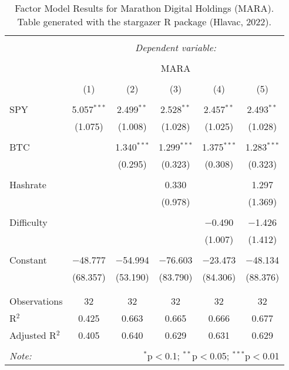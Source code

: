 
\begin{table}[!htbp] \centering 
  \caption{Factor Model Results for Marathon Digital Holdings (MARA). Table generated with the stargazer R package (Hlavac, 2022).} 
  \label{ModelResults_MARA} 
\large 
\begin{tabular}{@{\extracolsep{5pt}}lccccc} 
\\[-1.8ex]\hline 
\hline \\[-1.8ex] 
 & \multicolumn{5}{c}{\textit{Dependent variable:}} \\ 
\cline{2-6} 
\\[-1.8ex] & \multicolumn{5}{c}{MARA} \\ 
\\[-1.8ex] & (1) & (2) & (3) & (4) & (5)\\ 
\hline \\[-1.8ex] 
 SPY & 5.057$^{***}$ & 2.499$^{**}$ & 2.528$^{**}$ & 2.457$^{**}$ & 2.493$^{**}$ \\ 
  & (1.075) & (1.008) & (1.028) & (1.025) & (1.028) \\ 
  & & & & & \\ 
 BTC &  & 1.340$^{***}$ & 1.299$^{***}$ & 1.375$^{***}$ & 1.283$^{***}$ \\ 
  &  & (0.295) & (0.323) & (0.308) & (0.323) \\ 
  & & & & & \\ 
 Hashrate &  &  & 0.330 &  & 1.297 \\ 
  &  &  & (0.978) &  & (1.369) \\ 
  & & & & & \\ 
 Difficulty &  &  &  & $-$0.490 & $-$1.426 \\ 
  &  &  &  & (1.007) & (1.412) \\ 
  & & & & & \\ 
 Constant & $-$48.777 & $-$54.994 & $-$76.603 & $-$23.473 & $-$48.134 \\ 
  & (68.357) & (53.190) & (83.790) & (84.306) & (88.376) \\ 
  & & & & & \\ 
\hline \\[-1.8ex] 
Observations & 32 & 32 & 32 & 32 & 32 \\ 
R$^{2}$ & 0.425 & 0.663 & 0.665 & 0.666 & 0.677 \\ 
Adjusted R$^{2}$ & 0.405 & 0.640 & 0.629 & 0.631 & 0.629 \\ 
\hline 
\hline \\[-1.8ex] 
\textit{Note:}  & \multicolumn{5}{r}{$^{*}$p$<$0.1; $^{**}$p$<$0.05; $^{***}$p$<$0.01} \\ 
\end{tabular} 
\end{table} 
